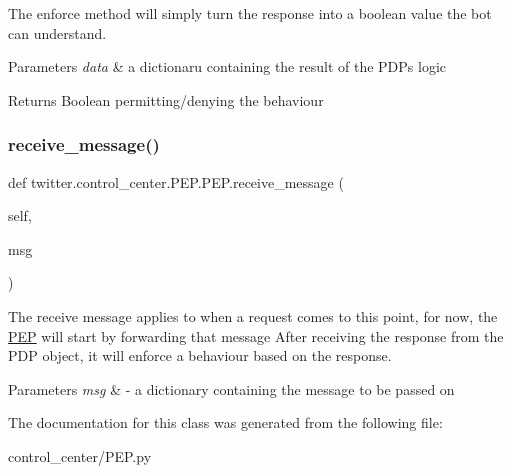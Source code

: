 The enforce method will simply turn the response into a boolean value the bot can understand. 


\begin{DoxyParams}{Parameters}
{\em data} & a dictionaru containing the result of the P\+DP\textquotesingle{}s logic\\
\hline
\end{DoxyParams}
\begin{DoxyReturn}{Returns}
Boolean permitting/denying the behaviour 
\end{DoxyReturn}
\mbox{\label{classtwitter_1_1control__center_1_1PEP_1_1PEP_a77d6cfa9b9fed7164b8c370b7147922f}} 
\subsubsection{\texorpdfstring{receive\+\_\+message()}{receive\_message()}}
{\footnotesize\ttfamily def twitter.\+control\+\_\+center.\+P\+E\+P.\+P\+E\+P.\+receive\+\_\+message (\begin{DoxyParamCaption}\item[{}]{self,  }\item[{}]{msg }\end{DoxyParamCaption})}



The receive message applies to when a request comes to this point, for now, the \hyperlink{classtwitter_1_1control__center_1_1PEP_1_1PEP}{P\+EP} will start by forwarding that message After receiving the response from the P\+DP object, it will enforce a behaviour based on the response. 


\begin{DoxyParams}{Parameters}
{\em msg} & -\/ a dictionary containing the message to be passed on \\
\hline
\end{DoxyParams}


The documentation for this class was generated from the following file\+:\begin{DoxyCompactItemize}
\item 
control\+\_\+center/P\+E\+P.\+py\end{DoxyCompactItemize}
